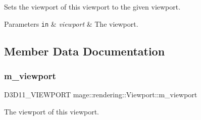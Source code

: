 Sets the viewport of this viewport to the given viewport.


\begin{DoxyParams}[1]{Parameters}
\mbox{\tt in}  & {\em viewport} & The viewport. \\
\hline
\end{DoxyParams}


\subsection{Member Data Documentation}
\hypertarget{classmage_1_1rendering_1_1_viewport_ab0b20f21a771248d9e9659f1029a497d}{}\label{classmage_1_1rendering_1_1_viewport_ab0b20f21a771248d9e9659f1029a497d} 
\subsubsection{\texorpdfstring{m\+\_\+viewport}{m\_viewport}}
{\footnotesize\ttfamily D3\+D11\+\_\+\+V\+I\+E\+W\+P\+O\+RT mage\+::rendering\+::\+Viewport\+::m\+\_\+viewport\hspace{0.3cm}{\ttfamily [private]}}

The viewport of this viewport. 